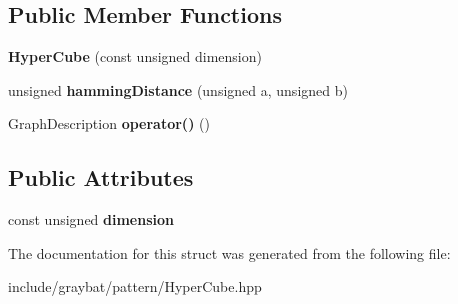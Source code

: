 \subsection*{Public Member Functions}
\begin{DoxyCompactItemize}
\item 
\hypertarget{structgraybat_1_1pattern_1_1HyperCube_aef4094e09277a7d45835ad74e19fecaa}{}{\bfseries Hyper\+Cube} (const unsigned dimension)\label{structgraybat_1_1pattern_1_1HyperCube_aef4094e09277a7d45835ad74e19fecaa}

\item 
\hypertarget{structgraybat_1_1pattern_1_1HyperCube_a03de3c97f0dc0b454e8be23f5678b3af}{}unsigned {\bfseries hamming\+Distance} (unsigned a, unsigned b)\label{structgraybat_1_1pattern_1_1HyperCube_a03de3c97f0dc0b454e8be23f5678b3af}

\item 
\hypertarget{structgraybat_1_1pattern_1_1HyperCube_aa963c5a07bf028989c244bc861b32144}{}Graph\+Description {\bfseries operator()} ()\label{structgraybat_1_1pattern_1_1HyperCube_aa963c5a07bf028989c244bc861b32144}

\end{DoxyCompactItemize}
\subsection*{Public Attributes}
\begin{DoxyCompactItemize}
\item 
\hypertarget{structgraybat_1_1pattern_1_1HyperCube_a9d3b75c69fd39c9035251c7a1ddaeacb}{}const unsigned {\bfseries dimension}\label{structgraybat_1_1pattern_1_1HyperCube_a9d3b75c69fd39c9035251c7a1ddaeacb}

\end{DoxyCompactItemize}


The documentation for this struct was generated from the following file\+:\begin{DoxyCompactItemize}
\item 
include/graybat/pattern/Hyper\+Cube.\+hpp\end{DoxyCompactItemize}
